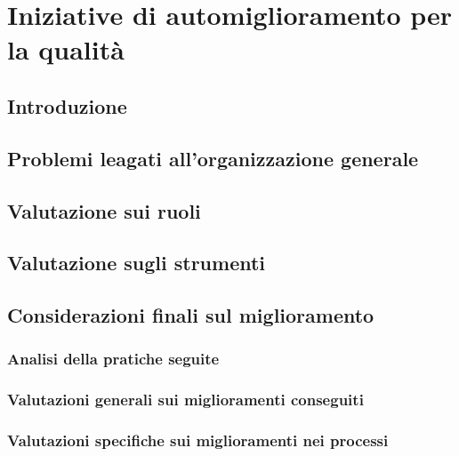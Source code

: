 \section{Iniziative di automiglioramento per la qualità}
\subsection{Introduzione}
\subsection{Problemi leagati all’organizzazione generale}
\subsection{Valutazione sui ruoli}
\subsection{Valutazione sugli strumenti}
\subsection{Considerazioni finali sul miglioramento}
\subsubsection{Analisi della pratiche seguite}
\subsubsection{Valutazioni generali sui miglioramenti conseguiti}
\subsubsection{Valutazioni specifiche sui miglioramenti nei processi}
